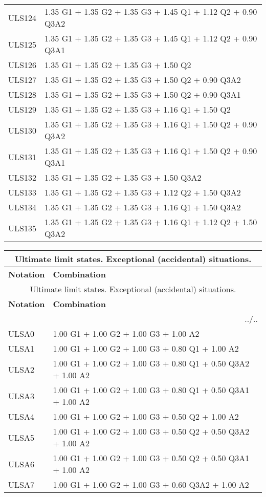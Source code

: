 \begin{center}
\begin{small}
\begin{longtable}{|l|p{10cm}|}
ULS124 & 1.35 G1 + 1.35 G2 + 1.35 G3 + 1.45 Q1 + 1.12 Q2 + 0.90 Q3A2\\
ULS125 & 1.35 G1 + 1.35 G2 + 1.35 G3 + 1.45 Q1 + 1.12 Q2 + 0.90 Q3A1\\
ULS126 & 1.35 G1 + 1.35 G2 + 1.35 G3 + 1.50 Q2\\
ULS127 & 1.35 G1 + 1.35 G2 + 1.35 G3 + 1.50 Q2 + 0.90 Q3A2\\
ULS128 & 1.35 G1 + 1.35 G2 + 1.35 G3 + 1.50 Q2 + 0.90 Q3A1\\
ULS129 & 1.35 G1 + 1.35 G2 + 1.35 G3 + 1.16 Q1 + 1.50 Q2\\
ULS130 & 1.35 G1 + 1.35 G2 + 1.35 G3 + 1.16 Q1 + 1.50 Q2 + 0.90 Q3A2\\
ULS131 & 1.35 G1 + 1.35 G2 + 1.35 G3 + 1.16 Q1 + 1.50 Q2 + 0.90 Q3A1\\
ULS132 & 1.35 G1 + 1.35 G2 + 1.35 G3 + 1.50 Q3A2\\
ULS133 & 1.35 G1 + 1.35 G2 + 1.35 G3 + 1.12 Q2 + 1.50 Q3A2\\
ULS134 & 1.35 G1 + 1.35 G2 + 1.35 G3 + 1.16 Q1 + 1.50 Q3A2\\
ULS135 & 1.35 G1 + 1.35 G2 + 1.35 G3 + 1.16 Q1 + 1.12 Q2 + 1.50 Q3A2\\
\hline
\end{longtable}
\end{small}
\end{center}
\begin{center}
\begin{small}
\begin{longtable}{|l|p{10cm}|}
\hline
\multicolumn{2}{|c|}{Ultimate limit states. Exceptional (accidental) situations.}\\
\hline
\textbf{Notation} & \textbf{Combination} \\
\hline
\endfirsthead
\hline
\multicolumn{2}{|c|}{Ultimate limit states. Exceptional (accidental) situations.}\\
\hline
\textbf{Notation} & \textbf{Combination} \\
\hline
\endhead
\hline \multicolumn{2}{|r|}{{../..}} \\ \hline
\endfoot
\hline
\endlastfoot
ULSA0 & 1.00 G1 + 1.00 G2 + 1.00 G3 + 1.00 A2\\
ULSA1 & 1.00 G1 + 1.00 G2 + 1.00 G3 + 0.80 Q1 + 1.00 A2\\
ULSA2 & 1.00 G1 + 1.00 G2 + 1.00 G3 + 0.80 Q1 + 0.50 Q3A2 + 1.00 A2\\
ULSA3 & 1.00 G1 + 1.00 G2 + 1.00 G3 + 0.80 Q1 + 0.50 Q3A1 + 1.00 A2\\
ULSA4 & 1.00 G1 + 1.00 G2 + 1.00 G3 + 0.50 Q2 + 1.00 A2\\
ULSA5 & 1.00 G1 + 1.00 G2 + 1.00 G3 + 0.50 Q2 + 0.50 Q3A2 + 1.00 A2\\
ULSA6 & 1.00 G1 + 1.00 G2 + 1.00 G3 + 0.50 Q2 + 0.50 Q3A1 + 1.00 A2\\
ULSA7 & 1.00 G1 + 1.00 G2 + 1.00 G3 + 0.60 Q3A2 + 1.00 A2\\
\hline
\end{longtable}
\end{small}
\end{center}
